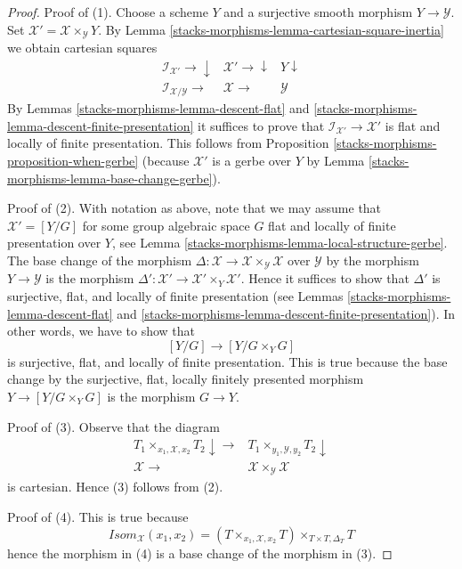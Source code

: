 \begin{proof}
Proof of (1).
Choose a scheme $Y$ and a surjective smooth morphism $Y \to \mathcal{Y}$.
Set $\mathcal{X}' = \mathcal{X} \times_\mathcal{Y} Y$.
By Lemma \ref{stacks-morphisms-lemma-cartesian-square-inertia} we obtain cartesian
squares
$$
\begin{array}{ccc}\mathcal{I}_{\mathcal{X}'} \longrightarrow\downarrow & \mathcal{X}' \longrightarrow\downarrow & Y \downarrow \\ \mathcal{I}_{\mathcal{X}/\mathcal{Y}} \longrightarrow & \mathcal{X} \longrightarrow & \mathcal{Y}\end{array}
$$
By Lemmas \ref{stacks-morphisms-lemma-descent-flat} and
\ref{stacks-morphisms-lemma-descent-finite-presentation}
it suffices to prove that $\mathcal{I}_{\mathcal{X}'} \to \mathcal{X}'$
is flat and locally of finite presentation.
This follows from Proposition \ref{stacks-morphisms-proposition-when-gerbe}
(because $\mathcal{X}'$ is a gerbe over $Y$ by
Lemma \ref{stacks-morphisms-lemma-base-change-gerbe}).

\medskip\noindent
Proof of (2). With notation as above, note that we may assume that
$\mathcal{X}' = [Y/G]$ for some group algebraic space $G$ flat and
locally of finite presentation over $Y$, see
Lemma \ref{stacks-morphisms-lemma-local-structure-gerbe}.
The base change of the morphism
$\Delta : \mathcal{X} \to \mathcal{X} \times_\mathcal{Y} \mathcal{X}$
over $\mathcal{Y}$ by the morphism $Y \to \mathcal{Y}$
is the morphism
$\Delta' : \mathcal{X}' \to \mathcal{X}' \times_Y \mathcal{X}'$.
Hence it suffices to show that $\Delta'$ is
surjective, flat, and locally of finite presentation
(see Lemmas \ref{stacks-morphisms-lemma-descent-flat} and
\ref{stacks-morphisms-lemma-descent-finite-presentation}).
In other words, we have to show that
$$
[Y/G] \longrightarrow [Y/G \times_Y G]
$$
is surjective, flat, and locally of finite presentation.
This is true because the base change by the surjective, flat,
locally finitely presented morphism $Y \to [Y/G \times_Y G]$
is the morphism $G \to Y$.

\medskip\noindent
Proof of (3). Observe that the diagram
$$
\begin{array}{cc}T_1 \times_{x_1, \mathcal{X}, x_2} T_2 \downarrow\longrightarrow & T_1 \times_{y_1, \mathcal{Y}, y_2} T_2 \downarrow \\ \mathcal{X} \longrightarrow & \mathcal{X} \times_\mathcal{Y} \mathcal{X}\end{array}
$$
is cartesian. Hence (3) follows from (2).

\medskip\noindent
Proof of (4). This is true because
$$
\mathit{Isom}_\mathcal{X}(x_1, x_2) =
(T \times_{x_1, \mathcal{X}, x_2} T) \times_{T \times T, \Delta_T} T
$$
hence the morphism in (4) is a base change of the morphism in (3).
\end{proof}


